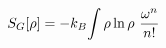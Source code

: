 \documentclass[preview]{standalone}
\begin{document}
\begin{align*}
\special{dvisvgm:raw <g id='unique000'>}S_G[\rho]=-k_B\!\int\rho\ln\rho\ \frac{\omega^n}{n!}\special{dvisvgm:raw </g>}
\end{align*}
\end{document}
